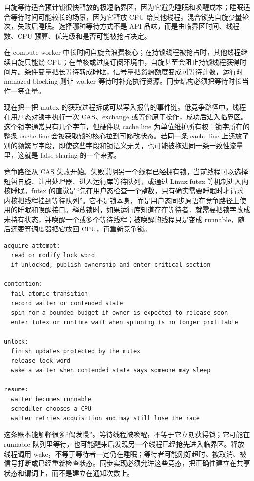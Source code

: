 自旋等待适合预计锁很快释放的极短临界区，因为它避免睡眠和唤醒成本；睡眠适合等待时间可能较长的场景，因为它释放 CPU 给其他线程。混合锁先自旋少量轮次，失败后睡眠。选择哪种等待方式不是 API 品味，而是由临界区时间、线程数、CPU 预算、优先级和是否可能被抢占决定。

在 compute worker 中长时间自旋会浪费核心；在持锁线程被抢占时，其他线程继续自旋只能烧 CPU；在单核或过度订阅环境中，自旋甚至会阻止持锁线程获得时间片。条件变量把长等待转成睡眠，信号量把资源额度变成可等待计数，运行时 managed blocking 则让 worker 等待时补充执行资源。同步结构必须把等待时长当作一等变量。

现在把一把 mutex 的获取过程拆成可以写入报告的事件链。低竞争路径中，线程在用户态对锁字执行一次 CAS、exchange 或等价原子操作，成功后进入临界区。这个锁字通常只有几个字节，但硬件以 cache line 为单位维护所有权；锁字所在的整条 cache line 会被获取锁的核心拉到可修改状态。若同一条 cache line 上还放了别的频繁写字段，即使这些字段和锁语义无关，也可能被拖进同一条一致性流量里，这就是 false sharing 的一个来源。

竞争路径从 CAS 失败开始。失败说明另一个线程已经拥有锁，当前线程可以选择短暂自旋、让出处理器、进入运行库等待队列，或通过 Linux futex 等机制进入内核睡眠。futex 的直觉是“先在用户态检查一个整数，只有确实需要睡眠时才请求内核把线程挂到等待队列”。它不是锁本身，而是用户态同步原语在竞争路径上使用的睡眠和唤醒接口。释放锁时，如果运行库知道存在等待者，就需要把锁字改成未持有状态，并唤醒一个或多个等待线程；被唤醒的线程只是变成 runnable，随后还要等调度器把它放回 CPU，再重新竞争锁。

\begin{lstlisting}[numbers=none,caption={锁竞争的完整事件账本}]
acquire attempt:
  read or modify lock word
  if unlocked, publish ownership and enter critical section

contention:
  fail atomic transition
  record waiter or contended state
  spin for a bounded budget if owner is expected to release soon
  enter futex or runtime wait when spinning is no longer profitable

unlock:
  finish updates protected by the mutex
  release lock word
  wake a waiter when contended state says someone may sleep

resume:
  waiter becomes runnable
  scheduler chooses a CPU
  waiter retries acquisition and may still lose the race
\end{lstlisting}

这条账本能解释很多“偶发慢”。等待线程被唤醒，不等于它立刻获得锁；它可能在 runnable 队列里等待，也可能醒来后发现另一个线程已经抢先进入临界区。释放线程调用 wake，不等于等待者一定仍在睡眠；等待者可能刚好超时、被取消、被信号打断或已经重新检查状态。同步实现必须允许这些竞态，把正确性建立在共享状态和谓词上，而不是建立在通知次数上。

